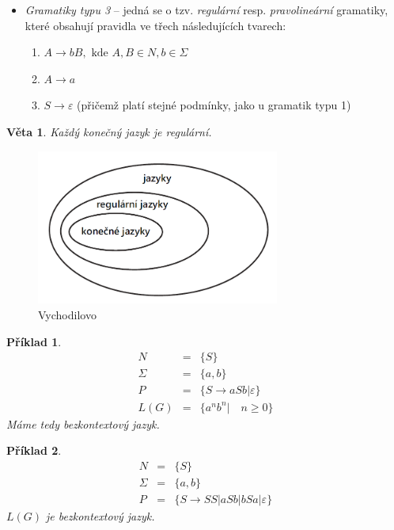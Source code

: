 \documentclass[10pt,a4paper]{article}
\theoremstyle{note}
\newtheorem{veta}{Věta}
\newtheorem{priklad}{Příklad}
\begin{document}
\begin{itemize}
\item
\textit{Gramatiky typu 3\label{gram-3}} -- jedná se o tzv. \textit{regulární} resp. \textit{pravolineární} gramatiky, které obsahují pravidla ve třech následujících tvarech:

\begin{enumerate}
\item
$A \rightarrow bB, \text{ kde } A,B \in N, b \in \Sigma$

\item
$A \rightarrow a$

\item
$S \rightarrow \varepsilon$ (přičemž platí stejné podmínky, jako u gramatik typu 1)
\end{enumerate}

\end{itemize}

\begin{veta}
Každý konečný jazyk je regulární.
\end{veta}


\begin{figure}[ht]
\centering\includegraphics[width=8cm]{img/vychodilovoVajicko.png}
\caption{Vychodilovo }\label{obr-2}
\end{figure}

\vspace{30px}

\begin{priklad}
\begin{eqnarray*}
N &=& \lbrace S \rbrace \\
\Sigma &=& \lbrace a, b \rbrace \\
P &=& \lbrace S \rightarrow aSb | \varepsilon \rbrace \\
L(G) &=& \lbrace a^{n}b^{n} | \quad n \geq 0 \rbrace
\end{eqnarray*}
Máme tedy \textit{bezkontextový} jazyk.
\end{priklad}

\begin{priklad}
\begin{eqnarray*}
N &=& \lbrace S \rbrace \\
\Sigma &=& \lbrace a, b \rbrace \\
P &=& \lbrace S \rightarrow SS|aSb|bSa| \varepsilon \rbrace
\end{eqnarray*}
$L(G)$ je \textit{bezkontextový} jazyk.
\end{priklad}
\end{document}
